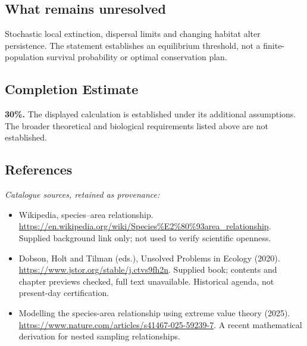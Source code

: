 \documentclass[11pt]{article}
\begin{document}
\subsection{What remains unresolved}
Stochastic local extinction, dispersal limits and changing habitat alter persistence. The statement establishes an equilibrium threshold, not a finite-population survival probability or optimal conservation plan.
\subsection{Completion Estimate}
\textbf{30\%.} The displayed calculation is established under its additional assumptions. The broader theoretical and biological requirements listed above are not established.
\subsection{References}
\noindent\emph{Catalogue sources, retained as provenance:}
\begin{itemize}
\item Wikipedia, species--area relationship. \url{https://en.wikipedia.org/wiki/Species%E2%80%93area_relationship}. Supplied background link only; not used to verify scientific openness.
\item Dobson, Holt and Tilman (eds.), Unsolved Problems in Ecology (2020). \url{https://www.jstor.org/stable/j.ctvs9fh2n}. Supplied book; contents and chapter previews checked, full text unavailable. Historical agenda, not present-day certification.
\item Modelling the species-area relationship using extreme value theory (2025). \url{https://www.nature.com/articles/s41467-025-59239-7}. A recent mathematical derivation for nested sampling relationships.
\end{itemize}
\clearpage


\appendix
\end{document}
